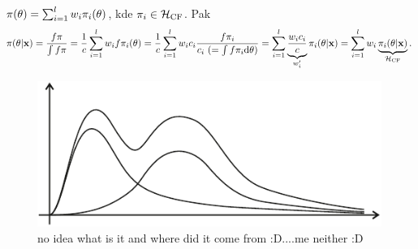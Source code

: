 \begin{remark}
	$\pi(\theta)=\sum_{i=1}^lw_i\pi_i(\theta)$, kde $\pi_i\in\mathcal{H}_\mathrm{CF}$. Pak $$\pi(\theta|\textbf{x})=\frac{f\pi}{\int f\pi}=\frac{1}{c}\sum_{i=1}^lw_i f\pi_i(\theta)=\frac{1}{c}\sum_{i=1}^l w_ic_i\frac{f \pi_i}{c_i~(=\int f\pi_i\mathrm{d}\theta)}=\sum_{i=1}^l \underbrace{\frac{w_ic_i}{c}}_{w_i'}\pi_i(\theta|\textbf{x})=\sum_{i=1}^l w_i\underbrace{\pi_i(\theta|\textbf{x})}_{\mathcal{H}_\mathrm{CF}}.$$
		\begin{figure}[h]
			\centering
			\includegraphics[width=0.6\linewidth]{pictures/8_1.pdf}
			\caption{no idea what is it and where did it come from :D....me neither :D}
			\label{fig:81}
		\end{figure}
		
\end{remark}

